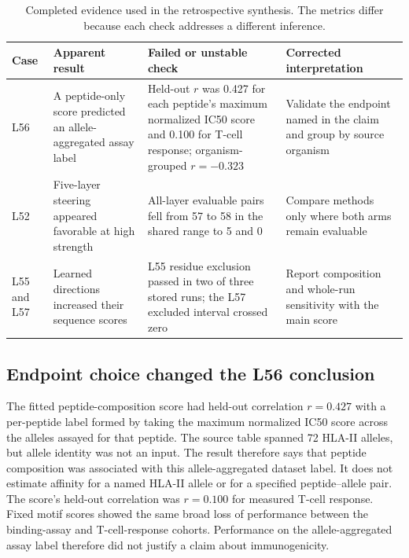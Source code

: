\documentclass{article}
\begin{document}
\FloatBarrier
\begin{table}[htbp]
\centering
\caption{Completed evidence used in the retrospective synthesis. The metrics
differ because each check addresses a different inference.}
\label{tab:cases}
\small
\begin{tabular}{@{}>{\raggedright\arraybackslash}p{2.0cm}
                    >{\raggedright\arraybackslash}p{3.2cm}
                    >{\raggedright\arraybackslash}p{4.0cm}
                    >{\raggedright\arraybackslash}p{3.5cm}@{}}
\toprule
Case & Apparent result & Failed or unstable check & Corrected interpretation \\
\midrule
L56 & A peptide-only score predicted an allele-aggregated assay label &
Held-out $r$ was 0.427 for each peptide's maximum normalized IC50 score and
0.100 for T-cell response; organism-grouped $r=-0.323$ &
Validate the endpoint named in the claim and group by source organism \\
\addlinespace
L52 & Five-layer steering appeared favorable at high strength &
All-layer evaluable pairs fell from 57 to 58 in the shared range to 5 and 0 &
Compare methods only where both arms remain evaluable \\
\addlinespace
L55 and L57 & Learned directions increased their sequence scores &
L55 residue exclusion passed in two of three stored runs; the L57 excluded
interval crossed zero &
Report composition and whole-run sensitivity with the main score \\
\bottomrule
\end{tabular}
\end{table}
\FloatBarrier

\subsection{Endpoint choice changed the L56 conclusion}

The fitted peptide-composition score had held-out correlation $r=0.427$ with
a per-peptide label formed by taking the maximum normalized IC50 score across
the alleles assayed for that peptide. The source table spanned 72 HLA-II
alleles, but allele identity was not an input. The result therefore says that
peptide composition was associated with this allele-aggregated dataset label.
It does not estimate affinity for a named HLA-II allele or for a specified
peptide--allele pair. The score's held-out correlation was $r=0.100$ for
measured T-cell response. Fixed motif scores showed the same broad loss of
performance between the binding-assay and T-cell-response cohorts. Performance
on the allele-aggregated assay label therefore did not justify a claim about
immunogenicity.
\end{document}
